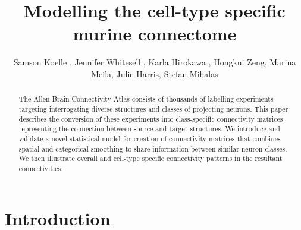 \documentclass[NETN,manuscript]{stjour-new}
\begin{document}

\title{Modelling the cell-type specific murine connectome}

\author[Koelle et al]%
{Samson Koelle , Jennifer Whitesell , Karla Hirokawa ,  Hongkui Zeng, Marina Meila, Julie Harris, Stefan Mihalas}





\begin{abstract}

The Allen Brain Connectivity Atlas consists of thousands of labelling experiments targeting interrogating diverse structures and classes of projecting neurons.
This paper describes the conversion of these experiments into class-specific connectivity matrices representing the connection between source and target structures.
We introduce and validate a novel statistical model for creation of connectivity matrices that combines spatial and categorical smoothing to share information between similar neuron classes.
We then illustrate overall and cell-type specific connectivity patterns in the resultant connectivities.

\end{abstract}

\begin{authorsummary}
\end{authorsummary}

\newpage

\section{Introduction}
 
\end{document}
